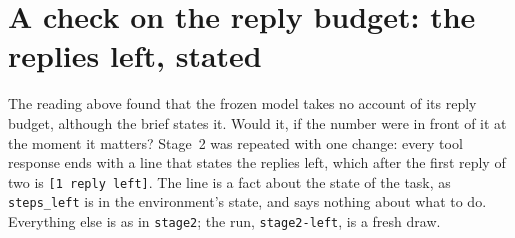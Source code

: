 \documentclass[11pt,a4paper]{article}
\begin{document}
\clearpage
\section{A check on the reply budget: the replies left, stated}
\label{sec:left}

The reading above found that the frozen model takes no account of its reply
budget, although the brief states it. Would it, if the number were in front
of it at the moment it matters? Stage~2 was repeated with one change: every
tool response ends with a line that states the replies left, which after
the first reply of two is \texttt{[1 reply left]}. The line is a fact about
the state of the task, as \texttt{steps\_left} is in the environment's
state, and says nothing about what to do. Everything else is as in
\texttt{stage2}; the run, \texttt{stage2-left}, is a fresh draw.

\begin{table}[h]
\centering\small
\resizebox{\linewidth}{!}{}
\caption{Stage~2 without and with the line that states the replies left.}
\label{tab:left-comparison}
\end{table}

\begin{table}[h]
\centering\small

\caption{The samples by the sequence of their replies, without and with the
line.}
\label{tab:left-sequences}
\end{table}

\begin{table}[h]
\centering\small
\resizebox{\linewidth}{!}{}
\caption{How the first probe run ended, against what the next reply was,
without and with the line.}
\label{tab:left-after}
\end{table}

\begin{table}[h]
\centering\small

\caption{What the first reply of each sample is, without and with the line.
The last row counts the samples in which some reply speaks of the reply
budget.}
\label{tab:left-first}
\end{table}
\end{document}
